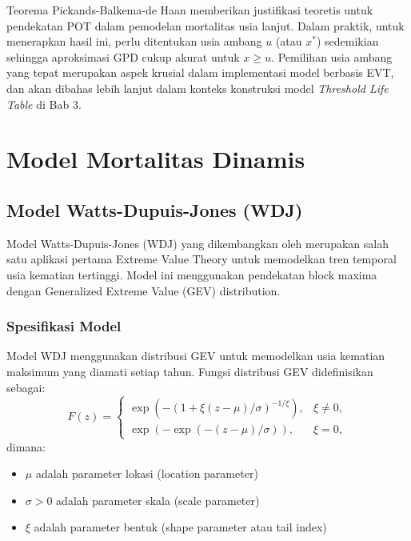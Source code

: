 Teorema Pickands-Balkema-de Haan memberikan justifikasi teoretis untuk pendekatan POT dalam pemodelan mortalitas usia lanjut. Dalam praktik, untuk menerapkan hasil ini, perlu ditentukan usia ambang $u$ (atau $x^*$) sedemikian sehingga aproksimasi GPD cukup akurat untuk $x \geq u$. Pemilihan usia ambang yang tepat merupakan aspek krusial dalam implementasi model berbasis EVT, dan akan dibahas lebih lanjut dalam konteks konstruksi model \textit{Threshold Life Table} di Bab 3.

\section{Model Mortalitas Dinamis}

\subsection{Model Watts-Dupuis-Jones (WDJ)}

Model Watts-Dupuis-Jones (WDJ) yang dikembangkan oleh \citet{watts2006extreme} merupakan salah satu aplikasi pertama Extreme Value Theory untuk memodelkan tren temporal usia kematian tertinggi. Model ini menggunakan pendekatan block maxima dengan Generalized Extreme Value (GEV) distribution.

\subsubsection{Spesifikasi Model}

Model WDJ menggunakan distribusi GEV untuk memodelkan usia kematian maksimum yang diamati setiap tahun. Fungsi distribusi GEV didefinisikan sebagai:
\begin{equation}
F(z) = \begin{cases}
\exp\left(-(1 + \xi(z - \mu)/\sigma)^{-1/\xi}\right), & \xi \neq 0, \\
\exp(-\exp(-(z - \mu)/\sigma)), & \xi = 0,
\end{cases}
\label{eq:gev_distribution}
\end{equation}
dimana:
\begin{itemize}
    \item $\mu$ adalah parameter lokasi (location parameter)
    \item $\sigma > 0$ adalah parameter skala (scale parameter)
    \item $\xi$ adalah parameter bentuk (shape parameter atau tail index)
\end{itemize}

